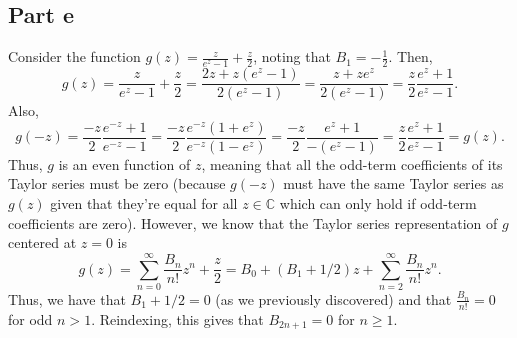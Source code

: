 \documentclass{article}
\begin{document}
\subsection{Part e}
Consider the function $g(z)=\frac{z}{e^z-1}+\frac{z}{2}$, noting that $B_1=-\frac{1}{2}$. Then, 
\[
g(z)=\frac{z}{e^z-1}+\frac{z}{2}=\frac{2z+z(e^z-1)}{2(e^z-1)}=\frac{z+ze^z}{2(e^z-1)}=\frac{z}{2}\frac{e^z+1}{e^z-1}.
\]
Also,
\[
g(-z)=\frac{-z}{2}\frac{e^{-z}+1}{e^{-z}-1}=\frac{-z}{2}\frac{e^{-z}(1+e^z)}{e^{-z}(1-e^z)}=\frac{-z}{2}\frac{e^z+1}{-(e^z-1)}=\frac{z}{2}\frac{e^z+1}{e^z-1}=g(z).
\]
Thus, $g$ is an even function of $z$, meaning that all the odd-term coefficients of its Taylor series must be zero (because $g(-z)$ must have the same Taylor series as $g(z)$ given that they're equal for all $z\in\mathbb{C}$ which can only hold if odd-term coefficients are zero). However, we know that the Taylor series representation of $g$ centered at $z=0$ is 
\[
g(z)=\sum_{n=0}^\infty \frac{B_n}{n!}z^n+\frac{z}{2}=B_0+(B_1+1/2)z+\sum_{n=2}^\infty \frac{B_n}{n!}z^n.
\]
Thus, we have that $B_1+1/2=0$ (as we previously discovered) and that $\frac{B_n}{n!}=0$ for odd $n>1$. Reindexing, this gives that $B_{2n+1}=0$ for $n\geq1$.
\end{document}
